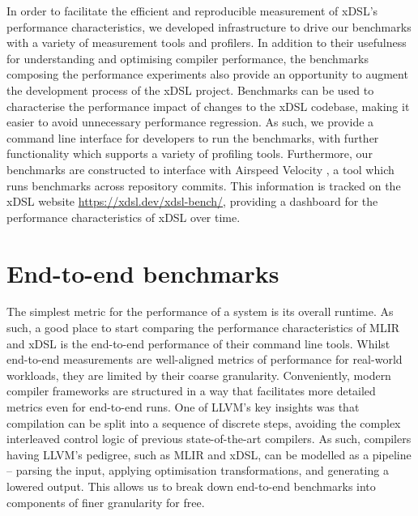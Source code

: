In order to facilitate the efficient and reproducible measurement of xDSL's performance characteristics, we developed infrastructure to drive our benchmarks with a variety of measurement tools and profilers.
In addition to their usefulness for understanding and optimising compiler performance, the benchmarks composing the performance experiments also provide an opportunity to augment the development process of the xDSL project.
Benchmarks can be used to characterise the performance impact of changes to the xDSL codebase, making it easier to avoid unnecessary performance regression.
As such, we provide a command line interface for developers to run the benchmarks, with further functionality which supports a variety of profiling tools. %
Furthermore, our benchmarks are constructed to interface with Airspeed Velocity \cite{michaeldroettboomAirspeedvelocityAsv2025}, a tool which runs benchmarks across repository commits. This information is tracked on the xDSL website \url{https://xdsl.dev/xdsl-bench/}, providing a dashboard for the performance characteristics of xDSL over time.


















\section{End-to-end benchmarks}
\label{sec:e2e-benchmarks}

The simplest metric for the performance of a system is its overall runtime.
As such, a good place to start comparing the performance characteristics of MLIR and xDSL is the end-to-end performance of their command line tools.
Whilst end-to-end measurements are well-aligned metrics of performance for real-world workloads, they are limited by their coarse granularity. Conveniently, modern compiler frameworks are structured in a way that facilitates more detailed metrics even for end-to-end runs. %
One of LLVM's key insights was that compilation can be split into a sequence of discrete steps, avoiding the complex interleaved control logic of previous state-of-the-art compilers.
As such, compilers having LLVM's pedigree, such as MLIR and xDSL, can be modelled as a pipeline -- parsing the input, applying optimisation transformations, and generating a lowered output.
This allows us to break down end-to-end benchmarks into components of finer granularity for free.

